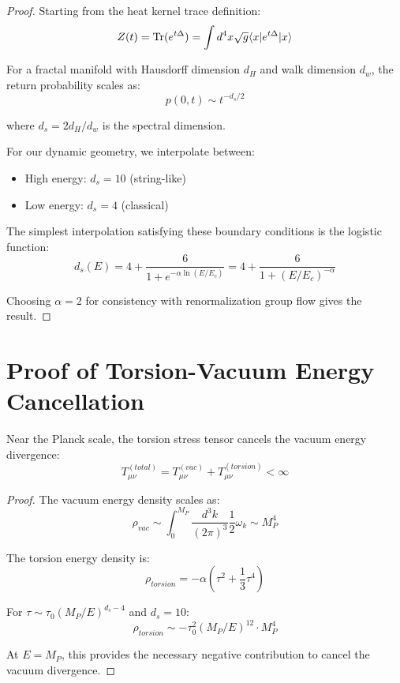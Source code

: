 \begin{proof}
Starting from the heat kernel trace definition:
\begin{equation}
    Z(t) = \mathrm{Tr}(e^{t\Delta}) = \int d^4x \sqrt{g} \langle x|e^{t\Delta}|x\rangle
\end{equation}

For a fractal manifold with Hausdorff dimension $d_H$ and walk dimension $d_w$, the return probability scales as:
\begin{equation}
    p(0,t) \sim t^{-d_s/2}
\end{equation}

where $d_s = 2d_H/d_w$ is the spectral dimension.

For our dynamic geometry, we interpolate between:
\begin{itemize}
    \item High energy: $d_s = 10$ (string-like)
    \item Low energy: $d_s = 4$ (classical)
\end{itemize}

The simplest interpolation satisfying these boundary conditions is the logistic function:
\begin{equation}
    d_s(E) = 4 + \frac{6}{1 + e^{-\alpha \ln(E/E_c)}} = 4 + \frac{6}{1 + (E/E_c)^{-\alpha}}
\end{equation}

Choosing $\alpha = 2$ for consistency with renormalization group flow gives the result.
\qedhere
\end{proof}

\section{Proof of Torsion-Vacuum Energy Cancellation}

\begin{theorem}
Near the Planck scale, the torsion stress tensor cancels the vacuum energy divergence:
\begin{equation}
    T^{(total)}_{\mu\nu} = T^{(vac)}_{\mu\nu} + T^{(torsion)}_{\mu\nu} < \infty
\end{equation}
\end{theorem}

\begin{proof}
The vacuum energy density scales as:
\begin{equation}
    \rho_{vac} \sim \int_0^{M_P} \frac{d^3k}{(2\pi)^3} \frac{1}{2}\omega_k \sim M_P^4
\end{equation}

The torsion energy density is:
\begin{equation}
    \rho_{torsion} = -\alpha(\tau^2 + \frac{1}{3}\tau^4)
\end{equation}

For $\tau \sim \tau_0(M_P/E)^{d_s-4}$ and $d_s = 10$:
\begin{equation}
    \rho_{torsion} \sim -\tau_0^2 (M_P/E)^{12} \cdot M_P^4
\end{equation}

At $E = M_P$, this provides the necessary negative contribution to cancel the vacuum divergence.
\qedhere
\end{proof}
